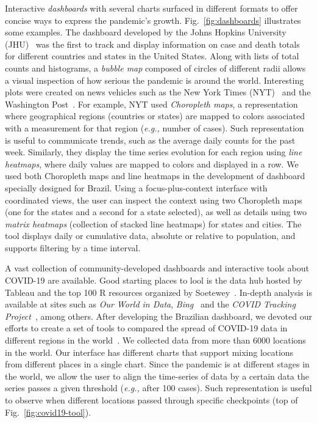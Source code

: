 \documentclass[10pt,journal,compsoc]{IEEEtran}
\newcommand{\eg}{\emph{e.g.,}\xspace}
\newcommand{\cv}{COVID-19\xspace}
\begin{document}
Interactive \emph{dashboards} with several charts surfaced in different formats to offer concise ways to express the pandemic's growth. Fig.~\ref{fig:dashboards} illustrates some examples. The dashboard developed by the Johns Hopkins University (JHU)~\cite{dashboardJHU} was the first to track and display information on case and death totals for different countries and states in the United States. Along with lists of total counts and histograms, a \emph{bubble map} composed of circles of different radii allows a visual inspection of how serious the pandemic is around the world. Interesting plots were created on news vehicles such as the New York Times (NYT)~\cite{NYT,WP} and the Washington Post~\cite{WP}. For example, NYT used \emph{Choropleth maps}, a representation where geographical regions (countries or states) are mapped to colors associated with a measurement for that region (\eg number of cases). Such representation is useful to communicate trends, such as the average daily counts for the past week. Similarly, they display the time series evolution for each region using \emph{line heatmaps}, where daily values are mapped to colors and displayed in a row. 
We used both Choropleth maps and line heatmaps in the development of dashboard specially designed for Brazil. Using a focus-plus-context interface with coordinated views, the user can inspect the context using two Choropleth maps (one for the states and a second for a state selected), as well as details using two \emph{matrix heatmaps} (collection of stacked line heatmaps) for states and cities. The tool displays daily or cumulative data, absolute or relative to population, and supports filtering by a time interval. 

%
A vast collection of community-developed dashboards and interactive tools about \cv are available. Good starting places to lool is the data hub hosted by Tableau and the top 100 R resources organized by Soetewey~\cite{R-resources}. In-depth analysis is available at sites such as \emph{Our World in Data}\cite{OWID},  \emph{Bing}~\cite{BING} and the \emph{COVID Tracking Project}~\cite{COVID-TRACKING}, among others. After developing the Brazilian dashboard, we devoted our efforts to create a set of tools to compared the spread of \cv data in different regions in the world~\cite{covid19-tools}. We collected data from more than 6000 locations in the world. Our interface has different charts that support mixing locations from different places in a single chart. Since the pandemic is at different stages in the world, we allow the user to align the time-series of data by a certain data the series passes a given threshold (\eg after 100 cases). Such representation is useful to observe when different locations passed through specific checkpoints (top of Fig.~\ref{fig:covid19-tool}). 
\end{document}
